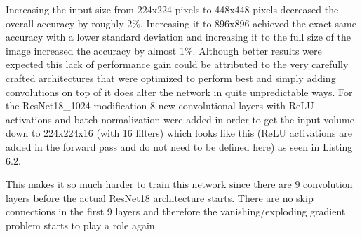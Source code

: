 \begin{table}[!h] \centering
{}
\caption{Different image input sizes are fed into ResNet18 architectures with only 16 filters per layer. The first layers of the network have been adapted to allow bigger input images.}
\label{tbl:resnet18-different-input}
\end{table}

Increasing the input size from 224x224 pixels to 448x448 pixels decreased the overall accuracy by roughly 2\%. Increasing it to 896x896 achieved the exact same accuracy with a lower standard deviation and increasing it to the full size of the image increased the accuracy by almost 1\%. Although better results were expected this lack of  performance  gain could be attributed to the very carefully crafted architectures that were optimized to perform best and simply adding convolutions on top of it does alter the network in quite unpredictable ways. For the ResNet18\_1024 modification 8 new convolutional layers with ReLU activations and batch normalization were added in order to get the input volume down to 224x224x16 (with 16 filters) which looks like this (ReLU activations are added in the forward pass and do not need to be defined here) as seen in Listing 6.2.

This makes it so much harder to train this network since there are 9 convolution layers before the actual ResNet18 architecture starts. There are no skip connections in the first 9 layers and therefore the vanishing/exploding gradient problem starts to play a role again.\\

\newpage

